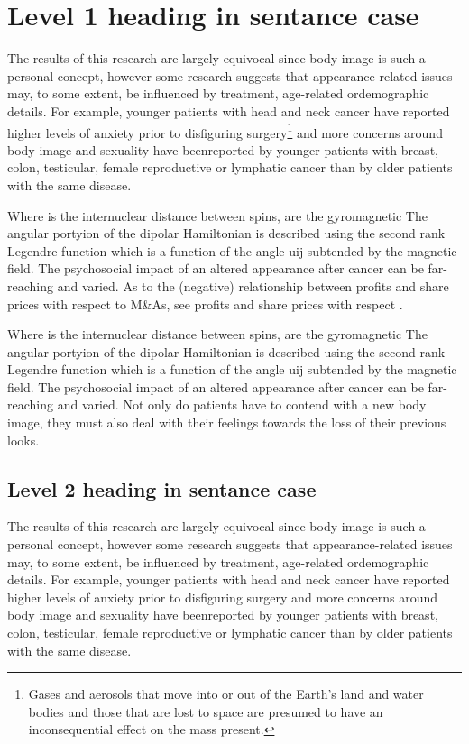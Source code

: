 \documentclass[onecolumn,authoryear]{els-mrw}
\begin{document}


\section{Level 1 heading in sentance case}\label{chap1:sec1}

The results of this research are largely equivocal since body image is such a personal
concept, however some research suggests that appearance-related issues may, to some
extent, be influenced by treatment, age-related ordemographic details. For example,
younger patients with head and neck cancer have reported higher levels of anxiety
prior to disfiguring surgery\footnote{Gases and aerosols that move into or out of the
Earth's land and water bodies and those that are lost to space are
presumed to have an inconsequential effect on the mass present.} and more concerns around body image and sexuality have
beenreported by younger patients with breast, colon, testicular, female reproductive or
lymphatic cancer than by older patients with the same disease.

Where is the internuclear distance between spins, are the gyromagnetic
The angular portyion of the dipolar Hamiltonian is described using the second rank
Legendre function which is a function of the angle uij subtended by the magnetic field.
The psychosocial impact of an altered appearance after cancer can be far-reaching and
varied. As to the (negative) relationship between profits and share prices with respect to M\&As, see profits and
share prices with respect \cite{bib1}.

Where is the internuclear distance between spins, are the gyromagnetic
The angular portyion of the dipolar Hamiltonian is described using the second rank
Legendre function which is a function of the angle uij subtended by the magnetic field.
The psychosocial impact of an altered appearance after cancer can be far-reaching and
varied. Not only do patients have to contend with a new body image, \cite{bib2} they must also
deal with their feelings towards the loss of their previous looks.

\subsection{Level 2 heading in sentance case}\label{chap1:subsec1}

The results of this research are largely equivocal since body image is such a personal
concept, however some research suggests that appearance-related issues may, to some
extent, be influenced by treatment, age-related ordemographic details. For example,
younger patients with head and neck cancer have reported higher levels of anxiety
prior to disfiguring surgery and more concerns around body image and sexuality have
beenreported by younger patients with breast, colon, testicular, female reproductive or
lymphatic cancer than by older patients with the same disease.
\end{document}
